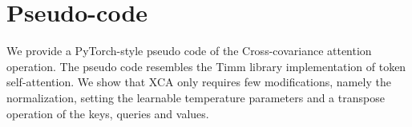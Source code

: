 \begin{table}[htb]
    \centering
    \caption{\textbf{Hyperparameters used for training our models}, including the Stochastic depth drop rate  and LayerScale initialization .}
    \label{tab:drop_layerscale}
\end{table}




\section{Pseudo-code}

We provide a PyTorch-style pseudo code of the Cross-covariance attention operation. The pseudo code resembles the Timm library \cite{rw2019timm} implementation of token self-attention. We show that XCA only requires few modifications, namely the  normalization, setting the learnable temperature parameters and a transpose operation of the keys, queries and values. 


